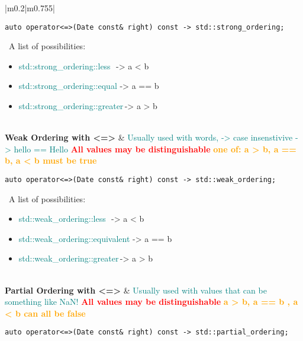 \documentclass[main.tex,fontsize=8pt,paper=a4,paper=portrait,DIV=calc,]{scrartcl}
\begin{document}
\begin{table}[ht!]
\begin{tabular}{|m{0.2\linewidth}|m{0.755\linewidth}|}
\begin{lstlisting}
auto operator<=>(Date const& right) const -> std::strong_ordering;
\end{lstlisting}
\, \newline
A list of possibilities:\newline
\begin{itemize}
  \item \textcolor{teal}{std::strong\_ordering::less} \,\,-> a < b 
  \item \textcolor{teal}{std::strong\_ordering::equal}\,\,-> a == b 
  \item \textcolor{teal}{std::strong\_ordering::greater}\,-> a > b 
  \vspace{-3mm}
\end{itemize}\\
\hline
\textbf{Weak Ordering with <=>} &
\textcolor{teal}{Usually used with words, -> case insenstivive -> hello == Hello}\newline
\textcolor{red}{\textbf{All values may be distinguishable}}\newline
\textcolor{orange}{\textbf{one of: a > b, a == b, a < b must be true}}\newline
\begin{lstlisting}
auto operator<=>(Date const& right) const -> std::weak_ordering;
\end{lstlisting}
\, \newline
A list of possibilities:\newline
\begin{itemize}
  \item \textcolor{teal}{std::weak\_ordering::less} \,\,-> a < b 
  \item \textcolor{teal}{std::weak\_ordering::equivalent}\,\,-> a == b 
  \item \textcolor{teal}{std::weak\_ordering::greater}\,-> a > b 
  \vspace{-3mm}
\end{itemize}\\
\hline
\textbf{Partial Ordering with <=>} &
\textcolor{teal}{Usually used with values that can be something like NaN!}\newline
\textcolor{red}{\textbf{All values may be distinguishable}}\newline
\textcolor{orange}{\textbf{a > b, a == b , a < b can all be false}}\newline
\begin{lstlisting}
auto operator<=>(Date const& right) const -> std::partial_ordering;
\end{lstlisting}

\end{tabular}
\end{table}
\end{document}
